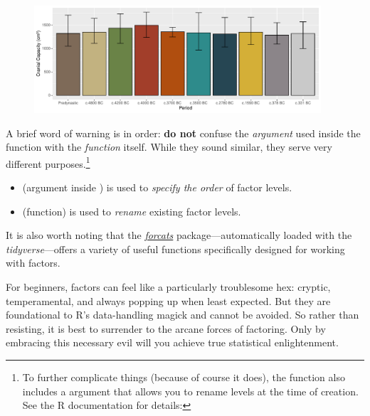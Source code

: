 \vspace{2em}

\begin{figure}[H]
\includegraphics[width = 0.95\textwidth]{graphics/ch3Figs/bar_7.pdf}
\end{figure}

A brief word of warning is in order: \textbf{do not} confuse the  \textit{argument} used inside the  function with the  \textit{function} itself. While they sound similar, they serve very different purposes.\footnote{To further complicate things (because of course it does), the  function also includes a  argument that allows you to rename levels at the time of creation. See the R documentation for details: }

\begin{itemize}
    \item {} (argument inside ) is used to \textit{specify the order} of factor levels.
    \item {} (function) is used to \textit{rename} existing factor levels.
\end{itemize}

\noindent
It is also worth noting that the \href{https://forcats.tidyverse.org/}{\textit{forcats}} package—automatically loaded with the \textit{tidyverse}—offers a variety of useful functions specifically designed for working with factors.

For beginners, factors can feel like a particularly troublesome hex: cryptic, temperamental, and always popping up when least expected. But they are foundational to R’s data-handling magick and cannot be avoided. So rather than resisting, it is best to surrender to the arcane forces of factoring. Only by embracing this necessary evil will you achieve true statistical enlightenment.
